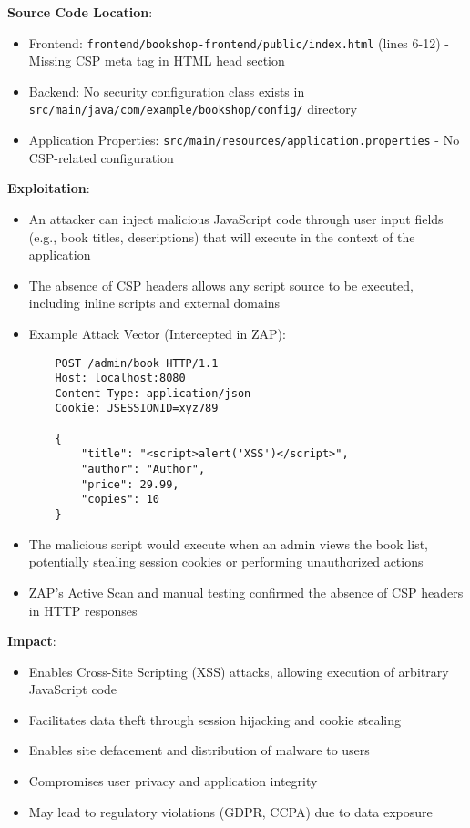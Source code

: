 \documentclass[]{UCD_CS_FYP_Report}
\begin{document}
\textbf{Source Code Location}: 
\begin{itemize}
    \item Frontend: \texttt{frontend/bookshop-frontend/public/index.html} (lines 6-12) - Missing CSP meta tag in HTML head section
    \item Backend: No security configuration class exists in \texttt{src/main/java/com/example/bookshop/config/} directory
    \item Application Properties: \texttt{src/main/resources/application.properties} - No CSP-related configuration
\end{itemize}

\textbf{Exploitation}:
\begin{itemize}
    \item An attacker can inject malicious JavaScript code through user input fields (e.g., book titles, descriptions) that will execute in the context of the application
    \item The absence of CSP headers allows any script source to be executed, including inline scripts and external domains
    \item Example Attack Vector (Intercepted in ZAP):
    \begin{verbatim}
    POST /admin/book HTTP/1.1
    Host: localhost:8080
    Content-Type: application/json
    Cookie: JSESSIONID=xyz789
    
    {
        "title": "<script>alert('XSS')</script>",
        "author": "Author",
        "price": 29.99,
        "copies": 10
    }
    \end{verbatim}
    \item The malicious script would execute when an admin views the book list, potentially stealing session cookies or performing unauthorized actions
    \item ZAP's Active Scan and manual testing confirmed the absence of CSP headers in HTTP responses
\end{itemize}

\textbf{Impact}:
\begin{itemize}
    \item Enables Cross-Site Scripting (XSS) attacks, allowing execution of arbitrary JavaScript code
    \item Facilitates data theft through session hijacking and cookie stealing
    \item Enables site defacement and distribution of malware to users
    \item Compromises user privacy and application integrity
    \item May lead to regulatory violations (GDPR, CCPA) due to data exposure
\end{itemize}
\end{document}
